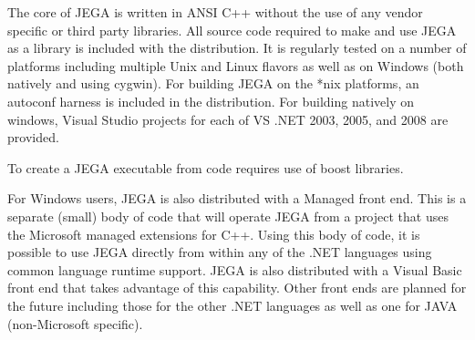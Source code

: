 The core of JEGA is written in ANSI C++ without the use of any vendor
specific or third party libraries.  All source code required to make
and use JEGA as a library is included with the distribution.  It is
regularly tested on a number of platforms including multiple Unix and
Linux flavors as well as on Windows (both natively and using cygwin).
For building JEGA on the *nix platforms, an autoconf harness is included
in the distribution.  For building natively on windows, Visual Studio
projects for each of VS .NET 2003, 2005, and 2008 are provided.

To create a JEGA executable from code requires use of boost libraries.

For Windows users, JEGA is also distributed with a Managed front
end.  This is a separate (small) body of code that will operate JEGA
from a project that uses the Microsoft managed extensions for C++.
Using this body of code, it is possible to use JEGA directly from
within any of the .NET languages using common language runtime
support.  JEGA is also distributed with a Visual Basic front end
that takes advantage of this capability.  Other front ends are
planned for the future including those for the other .NET languages
as well as one for JAVA (non-Microsoft specific).
